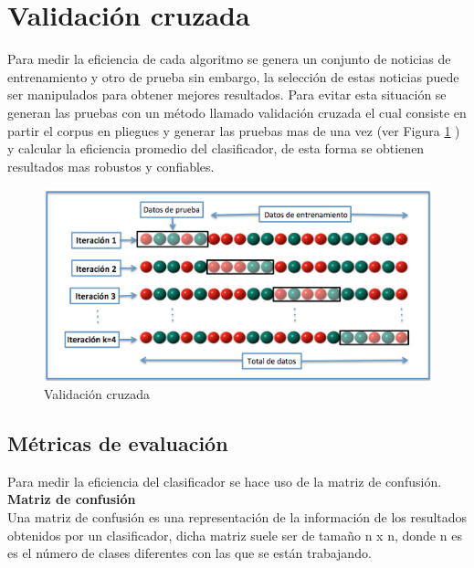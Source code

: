 
\section{Validación cruzada}

Para medir la eficiencia de cada algoritmo se genera un conjunto de noticias de entrenamiento y otro de prueba sin embargo, la selección de estas noticias puede ser manipulados para obtener mejores resultados. Para evitar esta situación se generan las pruebas con un método llamado validación cruzada el cual consiste en partir el corpus en pliegues y generar las pruebas mas de una vez (ver Figura \ref{fig:validacioncruzada} ) y calcular la eficiencia promedio del clasificador, de esta forma se obtienen resultados mas robustos y confiables.


\begin{figure}[ht]
\centering
\includegraphics[scale=0.5]{imagenes/Resultados/validacioncruzada.png}
\caption{Validación cruzada}
\label{fig:validacioncruzada}
\end{figure}


\subsection[Métricas]{Métricas de evaluación}

Para medir la eficiencia del clasificador se hace uso de la matriz de confusión.\\

\textbf{Matriz de confusión}\\

Una matriz de confusión es una representación de la información de los resultados obtenidos por un
clasificador, dicha matriz suele ser de tamaño n x n, donde n es es el número de clases diferentes con
las que se están trabajando.

